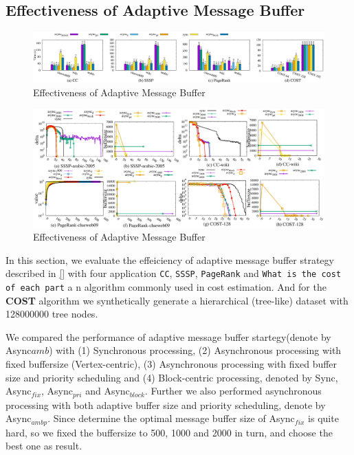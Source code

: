 \subsection{Effectiveness of Adaptive Message Buffer}
\label{sec:expr:AMBuffer}
\begin{figure}[!t]
	\vspace{0.0in}
	\centering
	\includegraphics[width=7.0in]{figuration/summary.eps}
	\vspace{-0.1in}
	\caption{Effectiveness of Adaptive Message Buffer}
	\label{fig:summary}
	\vspace{-0.1in}
\end{figure}
\begin{figure}[!t]
	\centering
	\includegraphics[width=7.6in]{figuration/combine.eps}
	\vspace{-0.1in}
	\caption{Effectiveness of Adaptive Message Buffer}
	\label{fig:details}
	\vspace{-0.1in}
\end{figure}



In this section, we evaluate the effeiciency of adaptive message buffer strategy described in \ref{} with four application \texttt{CC}, \texttt{SSSP}, \texttt{PageRank} and \texttt{What is the cost of each part}\cite{7113340} a n algorithm commonly used in cost estimation. And for the \textbf{COST} algorithm we synthetically generate a hierarchical (tree-like) dataset with 128000000 tree nodes.

We compared the performance of adaptive message buffer startegy(denote by Async${amb}$) with (1) Synchronous processing, (2) Asynchronous processing with fixed buffersize (Vertex-centric), (3) Asynchronous processing with fixed buffer size and priority scheduling and (4) Block-centric processing, denoted by Sync, Async$_{fix}$, Async$_{pri}$ and Async$_{block}$. Further we also performed asynchronous processing with both adaptive buffer size and priority scheduling, denote by Async$_{ambp}$. Since determine the optimal message buffer size of Async$_{fix}$ is quite hard, so we fixed the buffersize to 500, 1000 and 2000 in turn, and choose the best one as result.


